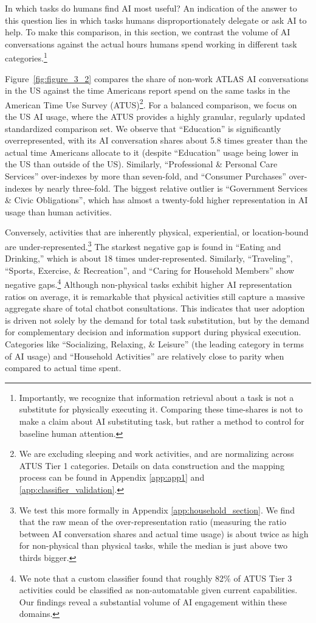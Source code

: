 \documentclass[11pt,a4paper]{article}
\begin{document}
In which tasks do humans find AI most useful? An indication of the answer to this question lies in which tasks humans disproportionately delegate or ask AI to help. To make this comparison, in this section, we contrast the volume of AI conversations against the actual hours humans spend working in different task categories.\footnote{Importantly, we recognize that information retrieval about a task is not a substitute for physically executing it. Comparing these time-shares is not to make a claim about AI substituting task, but rather a method to control for baseline human attention.}

Figure~\ref{fig:figure_3_2} compares the share of non-work ATLAS AI conversations in the US against the time Americans report spend on the same tasks in the American Time Use Survey (ATUS)\footnote{We are excluding sleeping and work activities, and are normalizing across ATUS Tier 1 categories. Details on data construction and the mapping process can be found in Appendix \ref{app:app1} and \ref{app:classifier_validation}.}. For a balanced comparison, we focus on the US AI usage, where the ATUS provides a highly granular, regularly updated standardized comparison set. We observe that ``Education'' is significantly overrepresented, with its AI conversation shares about 5.8 times greater than the actual time Americans allocate to it (despite ``Education'' usage being lower in the US than outside of the US). Similarly, ``Professional \& Personal Care Services'' over-indexes by more than seven-fold, and ``Consumer Purchases'' over-indexes by nearly three-fold. The biggest relative outlier is ``Government Services \& Civic Obligations'', which has almost a twenty-fold higher representation in AI usage than human activities.

Conversely, activities that are inherently physical, experiential, or location-bound are under-represented.\footnote{We test this more formally in Appendix \ref{app:household_section}. We find that the raw mean of the over-representation ratio (measuring the ratio between AI conversation shares and actual time usage) is about twice as high for non-physical than physical tasks, while the median is just above two thirds bigger.} The starkest negative gap is found in ``Eating and Drinking,'' which is about 18 times under-represented. Similarly, ``Traveling'', ``Sports, Exercise, \& Recreation'', and ``Caring for Household Members'' show negative gaps.\footnote{We note that a custom classifier found that roughly 82\% of ATUS Tier 3 activities could be classified as non-automatable given current capabilities. Our findings reveal a substantial volume of AI engagement within these domains.} Although non-physical tasks exhibit higher AI representation ratios on average, it is remarkable that physical activities still capture a massive aggregate share of total chatbot consultations. This indicates that user adoption is driven not solely by the demand for total task substitution, but by the demand for complementary decision and information support during physical execution. Categories like ``Socializing, Relaxing, \& Leisure'' (the leading category in terms of AI usage) and ``Household Activities'' are relatively close to parity when compared to actual time spent.
\end{document}
